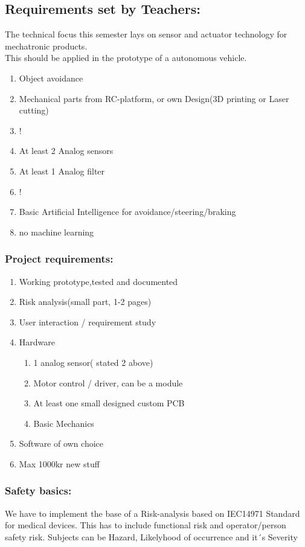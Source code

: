 \documentclass[../report.tex]{subfiles}
\begin{document}
\subsection{Requirements set by Teachers:}
The technical focus this semester lays on sensor and actuator technology for mechatronic products.
\\
This should be applied in the prototype of a autonomous vehicle.
\begin{enumerate}
    \item Object avoidance
    \item Mechanical parts from RC-platform, or own Design(3D printing or Laser cutting)
    \item !
    \item At least 2 Analog sensors
    \item At least 1 Analog filter
    \item !
    \item Basic Artificial Intelligence for avoidance/steering/braking
    \item no machine learning
\end{enumerate}
\subsubsection{Project requirements:}
\begin{enumerate}
    \item Working prototype,tested and documented
    \item Risk analysis(small part, 1-2 pages)
    \item User interaction / requirement study
    \item Hardware\begin{enumerate}
        \item 1 analog sensor( stated 2 above)
        \item Motor control / driver, can be a module
        \item At least one small designed custom PCB
        \item Basic Mechanics

    \end{enumerate}
    \item Software of own choice
    \item Max 1000kr new stuff
\end{enumerate}
\subsubsection{Safety basics:}
We have to implement the base of a Risk-analysis based on IEC14971 Standard for medical devices.
This has to include functional risk and operator/person safety risk. Subjects can be Hazard, Likelyhood
of occurrence and  it´s Severity
\end{document}
